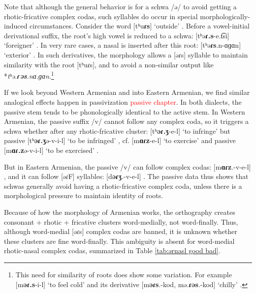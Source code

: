 	
	Note that although the general behavior is for a schwa /ə/ to avoid getting a rhotic-fricative complex codas, such syllables do   occur in special morphologically-induced circumstances. Consider the word [tʰu\textbf{ɾs}] `outside' . Before a vowel-initial derivational suffix, the root's high vowel is reduced to a schwa: [tʰə\textbf{ɾ.s}-e.t͡si] `foreigner' . In very rare cases,     a nasal is inserted after this root: [tʰə\textbf{ɾs}.n-ɑɡɑn] `exterior' . In such derivatives, the morphology allows a [əɾs] syllable to maintain similarity with the root [tʰuɾs], and to avoid a non-similar output like *\textit{tʰə.\textbf{ɾəs}.nɑ.ɡɑn}.\footnote{This need for similarity of roots  does show some variation.  For example [m\textbf{əɾ.s}-i-l] `to feel cold'  and its derivative [m\textbf{əɾs}.-kod, mə.\textbf{ɾəs}.-kod]   `chilly' . } 
	
	If we look beyond Western Armenian and into Eastern Armenian, we find similar analogical effects happen in passivization \textcolor{red}{passive chapter}. In both dialects, the passive stem tends to be phonologically identical to the active stem. In Western Armenian, the passive suffix /v/ cannot follow any complex coda, so it triggers a schwa whether after any rhotic-fricative cluster: [tʰ\textbf{əɾ.ʒ}-e-l] `to infringe'  but passive [tʰ\textbf{əɾ.ʒ}ə-v-i-l] `to be infringed' , cf. [m\textbf{ɑɾz}-e-l] `to exercise'  and passive [m\textbf{ɑɾ.z}ə-v-i-l] `to be exercised' .
	
	But in Eastern Armenian, the passive /v/ can follow complex codas: [m\textbf{ɑɾz}.-v-e-l] , and it  can follow [əɾF] syllables:   [d\textbf{əɾʒ}.-v-e-l] .  The passive data thus shows that schwas generally avoid having a rhotic-fricative complex coda, unless there is a morphological pressure to maintain identity of roots. 
	
	 \label{section:syllable:OtherCodaRestrictions:VowelCons:Schwa:RhoticNasal}
	Because of how the morphology of Armenian works, the orthography creates consonant + rhotic + fricative clusters word-medially, not word-finally. Thus, although word-medial [əɾs] complex codas are banned, it is unknown whether these clusters are fine word-finally. This ambiguity is absent for word-medial rhotic-nasal complex codas, summarized in Table \ref{tab:ərnasl good bad}.   
	
